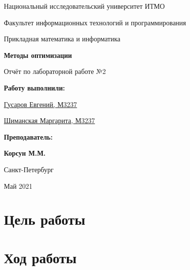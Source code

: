 \documentclass{article}
\begin{document}
{\large
    \begin{center}
        Национальный исследовательский университет ИТМО
    \end{center}
    \begin{center}
        Факультет информационных технологий и программирования
    \end{center}
    \begin{center}
        Прикладная математика и информатика
    \end{center}
    \vfill
    \begin{center}
        \textbf{\HUGE Методы оптимизации}
    \end{center}
    \newline
    \begin{center}
        Отчёт по лабораторной работе №2
    \end{center}
    \vfill
    \begin{flushright}
        \textbf{Работу выполнили:}
    \end{flushright}
    \begin{flushright}
        \underline{Гусаров Евгений, М3237}
    \end{flushright}
    \begin{flushright}
        \underline{Шиманская Маргарита, М3237}
    \end{flushright}
    \begin{flushright}
        \textbf{Преподаватель:}
    \end{flushright}
    \begin{flushright}
        \textbf{Корсун М.М.}
    \end{flushright}

    \mbox{}
    \vfill
    \begin{center}
        Санкт-Петербург
    \end{center}
    \begin{center}
        Май 2021
    \end{center}

    \newpage
    \tableofcontents

    \newpage


    \section{Цель работы}\label{sec:цель-работы}
    
}

    \section{Ход работы}\label{sec:ход-работы}
    
\end{document}
